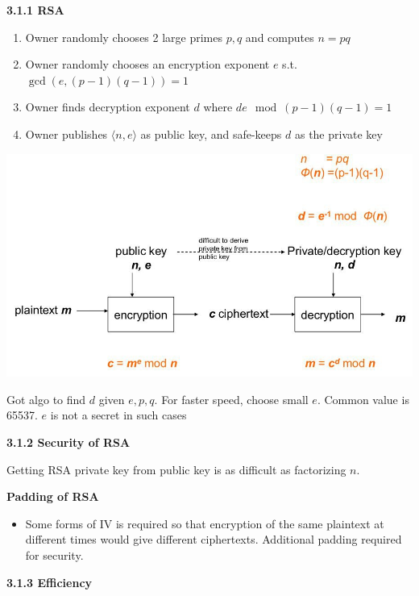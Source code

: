 \documentclass[landscape,a4paper]{extarticle}
\newenvironment{Figure}
  {\par\noindent\minipage{\linewidth}}
  {\endminipage\par\medskip}
\begin{document}
\begin{multicols*}{5}
    \textbf{3.1.1 RSA}

    \begin{enumerate}
        \item Owner randomly chooses 2 large primes $p, q$ and computes $n=pq$
        \item Owner randomly chooses an encryption exponent $e$ s.t. $\gcd(e, (p - 1)(q - 1)) = 1$
        \item Owner finds decryption exponent $d$ where $d e \mod(p - 1)(q - 1) = 1$
        \item Owner publishes $\langle n, e \rangle$ as public key, and safe-keeps $d$ as the private key
    \end{enumerate}

    \begin{Figure}
        \centering
        \includegraphics[width=\linewidth]{textbook_rsa.jpg}        
    \end{Figure}

    Got algo to find $d$ given $e, p, q$. For faster speed, choose small $e$. Common value is 65537.
    $e$ is not a secret in such cases

    \textbf{3.1.2 Security of RSA}

    Getting RSA private key from public key is as difficult as factorizing $n$.

    \textbf{Padding of RSA}

    \begin{itemize}
        \item Some forms of IV is required so that encryption of the same plaintext at different
        times would give different ciphertexts. Additional padding required for security.
    \end{itemize}

    \textbf{3.1.3 Efficiency}


\end{multicols*}
\end{document}
